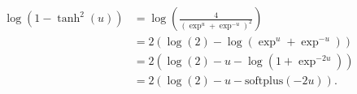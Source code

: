 \begin{equation}
\label{eq:logprob_openai}
\begin{aligned}
	\log \left( 1 - \tanh^2(u) \right) 	&= \log \left( \frac{4}{\left(\exp^u + \exp^{-u}\right)^2} \right)\\
							&= 2 \left( \log(2) - \log \left( \exp^u + \exp^{-u} \right) \right)\\
							&= 2 \left( \log(2) - u - \log \left( 1 + \exp^{-2u} \right) \right)\\
							&= 2 \left( \log(2) - u - \text{softplus} (-2u) \right).
\end{aligned}
\end{equation}